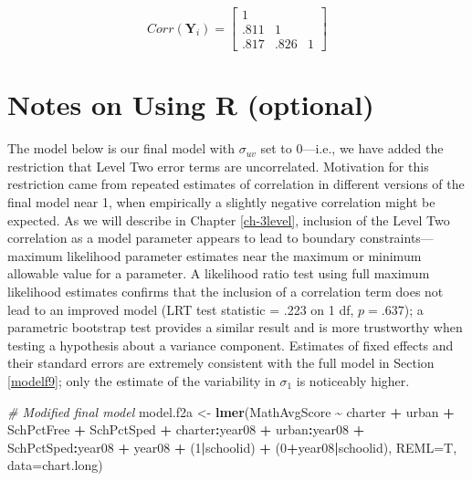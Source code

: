 \documentclass[
]{krantz}
\newenvironment{Shaded}{\begin{snugshade}}{\end{snugshade}}
\newcommand{\AttributeTok}[1]{\textcolor[rgb]{0.27,0.27,0.27}{#1}}
\newcommand{\CommentTok}[1]{\textcolor[rgb]{0.37,0.37,0.37}{\textit{#1}}}
\newcommand{\DecValTok}[1]{\textcolor[rgb]{0.06,0.06,0.06}{#1}}
\newcommand{\FunctionTok}[1]{\textcolor[rgb]{0.27,0.27,0.27}{\textbf{#1}}}
\newcommand{\NormalTok}[1]{#1}
\newcommand{\OtherTok}[1]{\textcolor[rgb]{0.37,0.37,0.37}{#1}}
\newcommand{\SpecialCharTok}[1]{\textcolor[rgb]{0.43,0.43,0.43}{\textbf{#1}}}
\begin{document}
\[ Corr(\mathbf{Y}_i) =  \left[
          \begin{array}{cccc}
            1 & &   \\
            .811 & 1 &  \\
            .817 & .826 & 1
          \end{array} \right] \]

\section{Notes on Using R (optional)}\label{notesr9}

The model below is our final model with \(\sigma_{uv}\) set to 0---i.e., we have added the restriction that Level Two error terms are uncorrelated. Motivation for this restriction came from repeated estimates of correlation in different versions of the final model near 1, when empirically a slightly negative correlation might be expected. As we will describe in Chapter \ref{ch-3level}, inclusion of the Level Two correlation as a model parameter appears to lead to boundary constraints---maximum likelihood parameter estimates near the maximum or minimum allowable value for a parameter. A likelihood ratio test using full maximum likelihood estimates confirms that the inclusion of a correlation term does not lead to an improved model (LRT test statistic = .223 on 1 df, \(p=.637\)); a parametric bootstrap test provides a similar result and is more trustworthy when testing a hypothesis about a variance component. Estimates of fixed effects and their standard errors are extremely consistent with the full model in Section \ref{modelf9}; only the estimate of the variability in \(\sigma_{1}\) is noticeably higher.

\begin{Shaded}
\begin{Highlighting}[]
\CommentTok{\# Modified final model}
\NormalTok{model.f2a }\OtherTok{\textless{}{-}} \FunctionTok{lmer}\NormalTok{(MathAvgScore }\SpecialCharTok{\textasciitilde{}}\NormalTok{ charter }\SpecialCharTok{+}\NormalTok{ urban }\SpecialCharTok{+}\NormalTok{ SchPctFree }\SpecialCharTok{+}
\NormalTok{  SchPctSped }\SpecialCharTok{+}\NormalTok{ charter}\SpecialCharTok{:}\NormalTok{year08 }\SpecialCharTok{+}\NormalTok{ urban}\SpecialCharTok{:}\NormalTok{year08 }\SpecialCharTok{+}
\NormalTok{  SchPctSped}\SpecialCharTok{:}\NormalTok{year08 }\SpecialCharTok{+}\NormalTok{ year08 }\SpecialCharTok{+}
\NormalTok{  (}\DecValTok{1}\SpecialCharTok{|}\NormalTok{schoolid) }\SpecialCharTok{+}\NormalTok{ (}\DecValTok{0}\SpecialCharTok{+}\NormalTok{year08}\SpecialCharTok{|}\NormalTok{schoolid), }\AttributeTok{REML=}\NormalTok{T, }\AttributeTok{data=}\NormalTok{chart.long)}
\end{Highlighting}
\end{Shaded}
\end{document}
